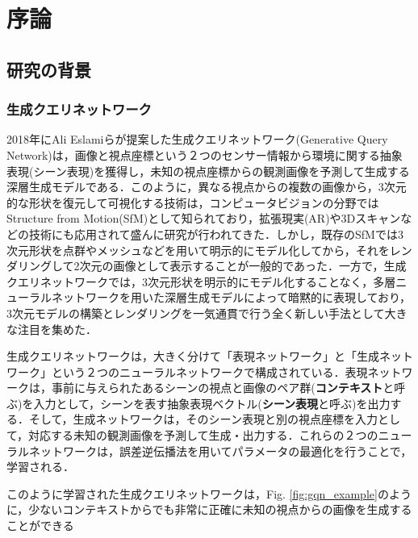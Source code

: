 \chapter{序論}
\label{chap:introduction}
\section{研究の背景}

\subsection{生成クエリネットワーク}
2018年にAli Eslamiらが提案した生成クエリネットワーク(Generative Query Network)\cite{Eslami2018}は，画像と視点座標という２つのセンサー情報から環境に関する抽象表現(シーン表現)を獲得し，未知の視点座標からの観測画像を予測して生成する深層生成モデルである．このように，異なる視点からの複数の画像から，3次元的な形状を復元して可視化する技術は，コンピュータビジョンの分野ではStructure from Motion(SfM)として知られており，拡張現実(AR)や3Dスキャンなどの技術にも応用されて盛んに研究が行われてきた．しかし，既存のSfMでは3次元形状を点群やメッシュなどを用いて明示的にモデル化してから，それをレンダリングして2次元の画像として表示することが一般的であった．一方で，生成クエリネットワークでは，3次元形状を明示的にモデル化することなく，多層ニューラルネットワークを用いた深層生成モデルによって暗黙的に表現しており，3次元モデルの構築とレンダリングを一気通貫で行う全く新しい手法として大きな注目を集めた．

生成クエリネットワークは，大きく分けて「表現ネットワーク」と「生成ネットワーク」という２つのニューラルネットワークで構成されている．表現ネットワークは，事前に与えられたあるシーンの視点と画像のペア群({\bf コンテキスト}と呼ぶ)を入力として，シーンを表す抽象表現ベクトル({\bf シーン表現}と呼ぶ)を出力する．そして，生成ネットワークは，そのシーン表現と別の視点座標を入力として，対応する未知の観測画像を予測して生成・出力する．これらの２つのニューラルネットワークは，誤差逆伝播法を用いてパラメータの最適化を行うことで，学習される．

このように学習された生成クエリネットワークは，Fig. \ref{fig:gqn_example}のように，少ないコンテキストからでも非常に正確に未知の視点からの画像を生成することができる

